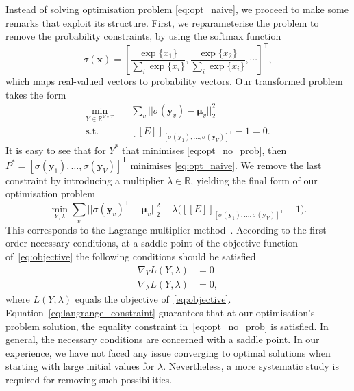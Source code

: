 \documentclass[acmsmall, review, anonymous]{acmart}\settopmatter{printfolios=true,printccs=false,printacmref=false}
\newcommand{\qqpi}[2]{[\![#2]\!]_{#1}}
\begin{document}
Instead of solving optimisation problem \eqref{eq:opt_naive}, we proceed to make some remarks that exploit its structure.
First, we reparameterise the problem to remove the probability constraints, by using the softmax function
\begin{equation}\label{eq:softmax}
	\sigma(\bm{x}) = \left[\frac{\exp\{x_1\}}{\sum_i \exp\{x_i\}}, \frac{\exp\{x_2\}}{\sum_i \exp\{x_i\}}, \cdots \right]^\mathsf{T},
\end{equation}
which maps real-valued vectors to probability vectors.
Our transformed problem takes the form
\begin{equation}
	\begin{aligned}\label{eq:opt_no_prob}
		\underset{Y \in \mathbb{R}^{V \times T}}{\mathrm{min}} & \quad
		\sum_v || \sigma(\bm{y}_v) - \bm{\mu}_v ||_2^2                                                                         \\
		\text{s.t. } & \quad
		\qqpi{[\sigma(\bm{y}_1), \ldots, \sigma(\bm{y}_{V})]^\mathsf{T}}{E} -1 = 0.
	\end{aligned}
\end{equation}
It is easy to see that for $Y^*$ that minimises \eqref{eq:opt_no_prob}, then
$P^* = [\sigma(\bm{y}_1), \ldots, \allowbreak \sigma(\bm{y}_{V})]^\mathsf{T}$
minimises \eqref{eq:opt_naive}.
% 
We remove the last constraint by introducing a multiplier $\lambda \in \mathbb{R}$, 
yielding the final form of our optimisation problem
\begin{equation}\label{eq:objective}
	\min_{Y, \lambda}
	\sum_v || \sigma(\bm{y}_v)^\mathsf{T} - \bm{\mu}_v ||_2^2
	- \lambda \big(\qqpi{[\sigma(\bm{y}_1), \ldots, \sigma(\bm{y}_{V})]^\mathsf{T}}{E} - 1\big).
\end{equation}
This corresponds to the Lagrange multiplier method~\citep{bertsekas82}.
According to the first-order necessary conditions, at a saddle point of the objective function of~\eqref{eq:objective} the following conditions should be satisfied
\begin{subequations}
\begin{align}
    \nabla_Y L(Y, \lambda) & = 0\\
    \nabla_\lambda L(Y, \lambda) & = 0,\label{eq:langrange_constraint}
\end{align}
\end{subequations}
where $L(Y, \lambda)$ equals the objective of~\eqref{eq:objective}.
Equation~\eqref{eq:langrange_constraint} guarantees that at our optimisation's problem solution, the equality constraint in~\eqref{eq:opt_no_prob} is satisfied.
In general, the necessary conditions are concerned with a saddle point.
In our experience, we have not faced any issue converging to optimal solutions when starting with large initial values for $\lambda$.
Nevertheless, a more systematic study is required for removing such possibilities.
\end{document}
